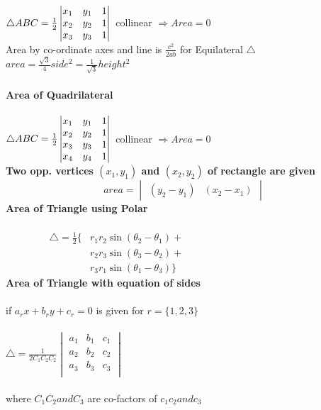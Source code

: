 \documentclass[11pt,a4paper,landscape]{article}
\begin{document}
\begin{multicols*}{3}
$
\triangle ABC = \frac{1}{2}
\begin{vmatrix}
x_1 & y_1 & 1\\
x_2 & y_2 & 1\\
x_3 & y_3 & 1\\
\end{vmatrix}\\ \\
$
collinear \hspace{10mm}$\Rightarrow Area = 0$\\
Area by co-ordinate axes and line is $\frac{c^2}{2ab}$
for Equilateral $\triangle$ \\
$area = \frac{\sqrt3}{4}side^2 = \frac{1}{\sqrt3}height^2$\\ \\
%
%
%
{\bfseries{\Large Area of Quadrilateral}}\\ \\
$
\triangle ABC = \frac{1}{2}
\begin{vmatrix}
x_1 & y_1 & 1\\
x_2 & y_2 & 1\\
x_3 & y_3 & 1\\
x_4 & y_4 & 1\\
\end{vmatrix}\\ \\
$
collinear \hspace{10mm}$\Rightarrow Area = 0$\\
{\bfseries Two opp. vertices $(x_1,y_1)$ and $(x_2,y_2)$ of rectangle are given}\\
$$
area = 
\begin{vmatrix}
(y_2 - y_1) & (x_2 - x_1)
\end{vmatrix}
$$
%
%
%
{\bfseries{\Large Area of Triangle using Polar}}\\ \\
$
\begin{aligned}
\qquad \qquad \triangle = \frac{1}{2}
\{
	&r_1 r_2 \sin(\theta_2 -\theta_1)+\\
	&r_2 r_3 \sin(\theta_3 -\theta_2)+\\
	&r_3 r_1 \sin(\theta_1 -\theta_3)
\}
\end{aligned}$\\
%
%
%
{\bfseries{\Large Area of Triangle with equation of sides}}\\ \\
if $a_r x +b_r y + c_r = 0$ is given for $r = \{1,2,3\}$\\ \\
$
\triangle = \frac{1}{2C_1 C_2 C_2}
\begin{vmatrix}
a_1 & b_1 & c_1\\
a_2 & b_2 & c_2\\
a_3 & b_3 & c_3\\
\end{vmatrix}
$\\ \\
where $C_1 C_2 and C_3$ are co-factors of $c_1 c_2 and c_3$
\end{multicols*}
\end{document}
